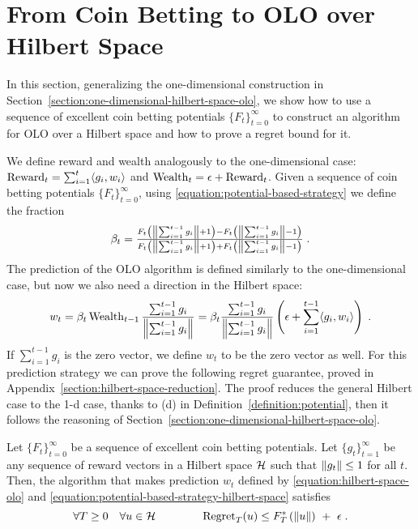 \section{From Coin Betting to OLO over Hilbert Space}
\label{section:reduction_hilbert}

In this section, generalizing the one-dimensional construction in
Section~\ref{section:one-dimensional-hilbert-space-olo}, we show how to use a
sequence of excellent coin betting potentials $\{F_t\}_{t=0}^\infty$ to
construct an algorithm for \ac{OLO} over a Hilbert space and how to prove a
regret bound for it.

We define reward and wealth analogously to the one-dimensional case:
$\operatorname{Reward}_t = \sum_{i=1}^t \langle g_i, w_i \rangle$ and $\operatorname{Wealth}_t = \epsilon +
\operatorname{Reward}_t$. Given a sequence of coin betting potentials $\{F_t\}_{t=0}^\infty$,
using \eqref{equation:potential-based-strategy} we define the fraction
\begin{equation}
\label{equation:potential-based-strategy-hilbert-space}
\beta_t
= \tfrac{F_t \left(\left\|{\sum_{i=1}^{t-1} g_i}\right\| + 1\right) - F_t\left(\left\|{\sum_{i=1}^{t-1} g_i}\right\| - 1 \right)}{F_t\left(\left\|{\sum_{i=1}^{t-1} g_i}\right\| + 1 \right) + F_t\left(\left\|{\sum_{i=1}^{t-1} g_i}\right\| - 1 \right)} \; .
\end{equation}
The prediction of the OLO algorithm is defined similarly to the one-dimensional case, but now we also need a direction in the Hilbert space:
\begin{equation}
\label{equation:hilbert-space-olo}
w_t
= \beta_t \operatorname{Wealth}_{t-1} \frac{\sum_{i=1}^{t-1} g_i}{\left\|{\sum_{i=1}^{t-1} g_i}\right\|}
= \beta_t \frac{\sum_{i=1}^{t-1} g_i}{\left\|{\sum_{i=1}^{t-1} g_i}\right\|} \left(\epsilon+ \sum_{i=1}^{t-1} \langle g_i, w_i\rangle \right) \; .
\end{equation}
\vspace{-0.01cm}
If $\sum_{i=1}^{t-1} g_i$ is the zero vector, we define $w_t$ to be the zero vector
as well.  For this prediction strategy we can prove the following regret
guarantee, proved in Appendix~\ref{section:hilbert-space-reduction}.  The proof
reduces the general Hilbert case to the 1-d case, thanks to (d) in
Definition~\ref{definition:potential}, then it follows the reasoning of
Section~\ref{section:one-dimensional-hilbert-space-olo}.
%
\begin{theorem}
\label{theorem:hilbert-space-olo-regret-bound}
Let $\{F_t\}_{t=0}^\infty$ be a sequence of excellent coin betting potentials.
Let $\{g_t\}_{t=1}^\infty$ be any sequence of reward vectors in a Hilbert space
$\mathcal{H}$ such that $\left\|{g_t}\right\| \le 1$ for all $t$. Then, the algorithm that makes
prediction $w_t$ defined by \eqref{equation:hilbert-space-olo} and
\eqref{equation:potential-based-strategy-hilbert-space} satisfies
\[
\forall T \ge 0 \quad
\forall u \in \mathcal{H} \qquad \qquad
\operatorname{Regret}_T(u) \le F_T^*\left(\left\|{u}\right\| \right) \ + \ \epsilon \; .
\]
\end{theorem}
